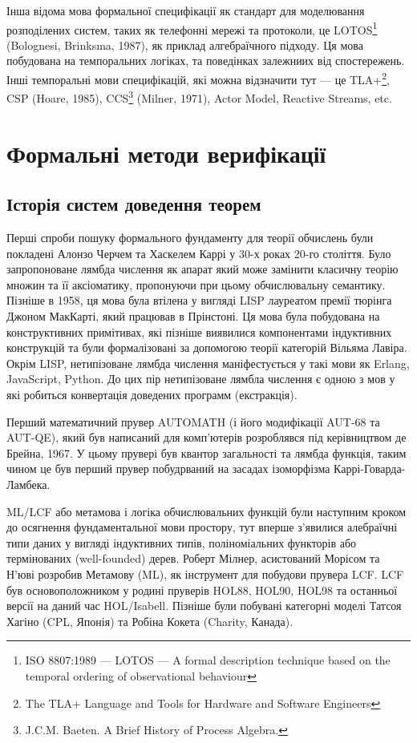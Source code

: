 \documentclass{article}
\begin{document}
Інша відома мова формальної специфікації як стандарт для моделювання розподілених систем,
таких як телефонні мережі та протоколи, це
LOTOS\footnote{ISO 8807:1989 --- LOTOS --- A formal description technique based
on the temporal ordering of observational behaviour} (Bolognesi, Brinksma, 1987), як приклад алгебраїчного підходу.
Ця мова побудована на темпоральних логіках, та поведінках залежниих від спостережень.
Інші темпоральні мови специфікацій, які можна відзначити тут --- це TLA+\footnote{The
TLA+ Language and Tools for Hardware and Software Engineers}, CSP (Hoare, 1985),
CCS\footnote{J.C.M. Baeten. A Brief History of Process Algebra.} (Milner, 1971), Actor Model, Reactive Streams, etc.

\section{Формальні методи верифікації}


\subsection{Історія систем доведення теорем}

Перші спроби пошуку формального фундаменту для теорії обчислень були покладені
Алонзо Черчем та Хаскелем Каррі у 30-х роках 20-го століття. Було запропоноване
лямбда числення як апарат який може замінити класичну теорію множин та її аксіоматику,
пропонуючи при цьому обчислювальну семантику. Пізніше в 1958, ця мова була втілена
у вигляді LISP лауреатом премії тюрінга Джоном МакКарті, який працював в Прінстоні.
Ця мова була побудована на конструктивних примітивах, які пізніше виявилися компонентами
індуктивних конструкцій та були формалізовані за допомогою
теорії категорій Вільяма Лавіра. Окрім LISP, нетипізоване лямбда числення
маніфестується у такі мови як Erlang, JavaScript, Python.
До цих пір нетипізоване лямбла числення є одною з мов у які робиться
конвертація доведених программ (екстракція).

Перший математичний прувер AUTOMATH (і його модифікації AUT-68 та AUT-QE),
який був написаний для комп'ютерів розроблявся під керівництвом де Брейна, 1967.
У цьому прувері був квантор загальності та лямбда функція, таким чином це був перший прувер
побудрваний на засадах ізоморфізма Каррі-Говарда-Ламбека.

ML/LCF або метамова і логіка обчислювальних функцій були наступним кроком до
осягнення фундаментальної мови простору, тут вперше з'явилися алебраїчні типи даних
у вигляді індуктивних типів, поліноміальних функторів або термінованих (well-founded) дерев.
Роберт Мілнер, асистований Морісом та Н'юві розробив Метамову (ML), як
інструмент для побудови прувера LCF. LCF був основоположником у родині пруверів
HOL88, HOL90, HOL98 та останньої версії на даний час HOL/Isabell.
Пізніше були побувані категорні моделі Татсоя Хагіно (CPL, Японія)
та Робіна Кокета (Charity, Канада).
\end{document}
